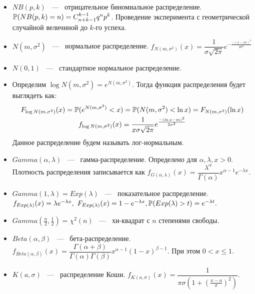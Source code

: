 \begin{itemize}
    \item $NB(p, k)$ ~---~ отрицательное биномиальное распределение. \newline $\P(NB(p, k) = n) = C_{n + k - 1}^{k - 1}q^np^k$. Проведение эксперимента с геометрической случайной величиной до $k$-го успеха. 
    \item $N(m, \sigma^2)$ ~---~ нормальное распределение. $f_{N(m, \sigma^2)}(x) = \dfrac{1}{\sigma \sqrt{2\pi}} e^{-\frac{-(x-m)^2}{2\sigma^2}}$
    \item $N(0, 1)$ ~---~ стандартное нормальное распределение. 
    \item Определим $\log N(m, \sigma^2) = e^{N(m, \sigma^2)}$. Тогда функция распределения будет выглядеть как:
    \begin{gather*}
        F_{\log N(m, \sigma^2)}(x) = \P(e^{N(m, \sigma^2)} < x) = \P(N(m, \sigma^2) < \ln x) = F_{N(m, \sigma^2)}(\ln x) \\ 
        f_{\log N(m, \sigma^2)}(x) = \dfrac{1}{x \sigma \sqrt{2\pi}} e^{\frac{-(\ln x - m)^2}{2\sigma^2}}
    \end{gather*}
    Данное распределение будем называть лог-нормальным. 
    \item $Gamma(\alpha, \lambda)$ ~---~ гамма-распределение. Определено для $\alpha, \lambda, x > 0.$ Плотность распределения записывается как $f_{G(\alpha, \lambda)}(x) = \dfrac{\lambda^{\alpha}}{\Gamma(\alpha)}x^{\alpha - 1}e^{-\lambda x}.$
    \item $Gamma(1, \lambda) = Exp(\lambda)$ ~---~ показательное распределение.  $f_{Exp(\lambda)}(x) = \lambda e^{-\lambda x}, \ F_{Exp(\lambda)}(x) = 1 - e^{-\lambda x}, \P(Exp(\lambda) > t) = e^{-\lambda t}.$
    \item $Gamma(\frac{n}{2}, \frac{1}{2}) = \chi^2(n)$ ~---~ хи-квадрат с $n$ степенями свободы.
    \item $Beta(\alpha, \beta)$ ~---~ бета-распределение. $f_{Beta(\alpha, \beta)}(x) = \dfrac{\Gamma(\alpha + \beta)}{\Gamma(\alpha)\Gamma(\beta)} x^{\alpha - 1}(1 - x)^{\beta - 1}$. При этом $0 < x \le 1$.
    \item $K(a, \sigma)$ ~---~ распределение Коши. $f_{K(a, \sigma)}(x) = \dfrac{1}{\pi\sigma\left(1 + \left(\frac{x - a}{\sigma}\right)^2\right)}$.
    
\end{itemize}

